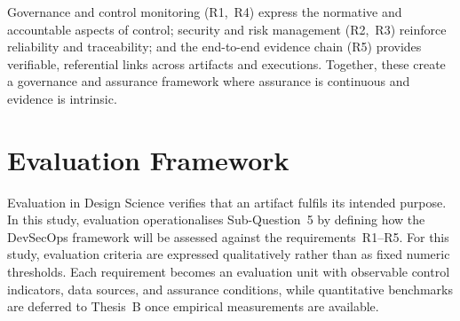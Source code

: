 \begin{table}[h]
  \centering
  \caption{Mapping between toolchain requirements and auditability dimensions.}
  \label{tab:req-auditability}
  \renewcommand{\arraystretch}{1.15}
\end{table}

\noindent
Governance and control monitoring (R1,~R4) express the normative and accountable
aspects of control; security and risk management (R2,~R3) reinforce reliability
and traceability; and the end-to-end evidence chain (R5) provides verifiable,
referential links across artifacts and executions. Together, these create a
governance and assurance framework where assurance is continuous and evidence is
intrinsic.

\section{Evaluation Framework}
\noindent
Evaluation in Design Science verifies that an artifact fulfils its intended
purpose. In this study, evaluation operationalises Sub-Question~5 by defining
how the DevSecOps framework will be assessed against the requirements~R1–R5.
For this study, evaluation criteria are expressed qualitatively
rather than as fixed numeric thresholds. Each requirement becomes an evaluation
unit with observable control indicators, data sources, and assurance
conditions, while quantitative benchmarks are deferred to Thesis~B once
empirical measurements are available.

